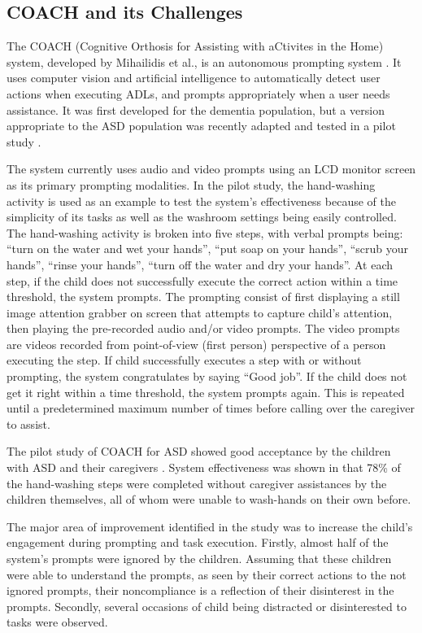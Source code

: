\documentclass{ut-thesis}
\begin{document}
\subsection{COACH and its Challenges}

The COACH (Cognitive Orthosis for Assisting with aCtivites in the Home) system, developed by Mihailidis et al., is an autonomous prompting system \cite{mihailidis2008coach}.  It uses computer vision and artificial intelligence to automatically detect user actions when executing ADLs, and prompts appropriately when a user needs assistance.  It was first developed for the dementia population, but a version appropriate to the ASD population was recently adapted and tested in a pilot study \cite{bimbrahw2012investigating}.


The system currently uses audio and video prompts using an LCD monitor screen as its primary prompting modalities.  In the pilot study, the hand-washing activity is used as an example to test the system's effectiveness because of the simplicity of its tasks as well as the washroom settings being easily controlled.  The hand-washing activity is broken into five steps, with verbal prompts being: ``turn on the water and wet your hands'', ``put soap on your hands'', ``scrub your hands'', ``rinse your hands'', ``turn off the water and dry your hands''.  At each step, if the child does not successfully execute the correct action within a time threshold, the system prompts.  The prompting consist of first displaying a still image attention grabber on screen that attempts to capture child's attention, then playing the pre-recorded audio and/or video prompts.  The video prompts are videos recorded from point-of-view (first person) perspective of a person executing the step.  If child successfully executes a step with or without prompting, the system congratulates by saying ``Good job''.  If the child does not get it right within a time threshold, the system prompts again.  This is repeated until a predetermined maximum number of times before calling over the caregiver to assist.  


The pilot study of COACH for ASD showed good acceptance by the children with ASD and their caregivers \cite{bimbrahw2012investigating}.  System effectiveness was shown in that 78\% of the hand-washing steps were completed without caregiver assistances by the children themselves, all of whom were unable to wash-hands on their own before.


The major area of improvement identified in the study was to increase the child's engagement during prompting and task execution.  Firstly, almost half of the system's prompts were ignored by the children.  Assuming that these children were able to understand the prompts, as seen by their correct actions to the not ignored prompts, their noncompliance is a reflection of their disinterest in the prompts.  Secondly, several occasions of child being distracted or disinterested to tasks were observed.
\end{document}
